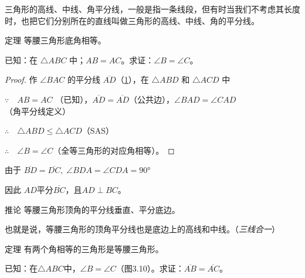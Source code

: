 三角形的高线、中线、角平分线，一般是指一条线段，但有时当我们不考虑其长度时，也把它们分别所在的直线叫做三角形的高线、中线、角的平分线。


\begin{Theorem}[等腰三角形性质定理]{定理}
等腰三角形底角相等。
\end{Theorem}

已知：在 $\triangle ABC$ 中；$AB=AC$。求证：$\angle B=\angle C$。

\begin{figure}
    \caption{}\label{fig:3-9}
\end{figure}
\begin{proof}
作 $\angle BAC$ 的平分线 $\overline{AD}$（\cref{fig:3-9}），在 $\triangle ABD$ 和 $\triangle ACD$ 中

$\because\quad AB=AC$ （已知），$\overline{AD}=\overline{AD}$（公共边），$\angle BAD=\angle CAD$（角平分线定义）

$\therefore\quad \triangle ABD≤\triangle ACD$（SAS）

$\therefore\quad \angle B=\angle C$（全等三角形的对应角相等）。
\end{proof}


由于 $\overline{BD}=\overline{DC},\; \angle BDA=\angle CDA=\ang{90}$

因此 $AD$平分$\overline{BC}$，且$AD\perp BC$。

\begin{Deduction}{推论}
等腰三角形顶角的平分线垂直、平分底边。
\end{Deduction}

也就是说，等腰三角形的顶角平分线也是底边上的高线和中线。（\emph{三线合一}）

\begin{Theorem}[等腰三角形的判定定理]{定理} 
有两个角相等的三角形是等腰三角形。
\end{Theorem}

已知：在$\triangle ABC$中，$\angle B=\angle C$（图3.10）。求证：$\overline{AB}=\overline{AC}$。

\begin{figure}
    \centering
{}
    \caption{}\label{fig:3-10}
\end{figure}


